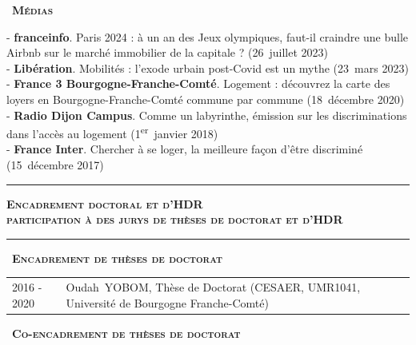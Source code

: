 \documentclass[a4paper,12pt]{article}
\newcommand{\titre}[1]{%
	\bigskip
	\noindent \rule[2mm]{\textwidth}{0.5pt}
	\textbf{\textsc{\large #1}} \\
	\noindent \rule[1mm]{\textwidth}{0.5pt}
	}
\newcommand{\smalltitre}[1]{%
	\noindent \textbullet~\textsc{\textbf{#1}}
	\smallskip
	}
\begin{document}
\smalltitre{Médias} \medskip

\noindent 
- \textbf{franceinfo}. \og{}Paris 2024 : à un an des Jeux olympiques, faut-il craindre une bulle Airbnb sur le marché immobilier de la capitale ?\fg{} (26~juillet 2023) \\
- \textbf{Libération}. \og{}Mobilités : l'exode urbain post-Covid est un mythe\fg{} (23~mars 2023) \\
- \textbf{France 3 Bourgogne-Franche-Comté}. \og{}Logement : découvrez la carte des loyers en Bourgogne-Franche-Comté commune par commune\fg{} (18~décembre 2020) \\
- \textbf{Radio Dijon Campus}. \og{}Comme un labyrinthe\fg{}, émission sur les discriminations dans l'accès au logement (1\textsuperscript{er}~janvier 2018) \\
- \textbf{France Inter}. \og{}Chercher à se loger, la meilleure façon d'être discriminé\fg{} (15~décembre 2017)

\newpage


\titre{Encadrement doctoral et d'HDR \\ participation à des jurys de thèses de doctorat et d'HDR}

\smalltitre{Encadrement de thèses de doctorat}
	
\noindent \begin{longtable}{@{}p{\annee}p{\texte}@{}}
2016 - 2020 & Oudah~YOBOM, Thèse de Doctorat (CESAER, UMR1041, Université de Bourgogne Franche-Comté) \\
\end{longtable}

\smalltitre{Co-encadrement de thèses de doctorat}
	
\end{document}
